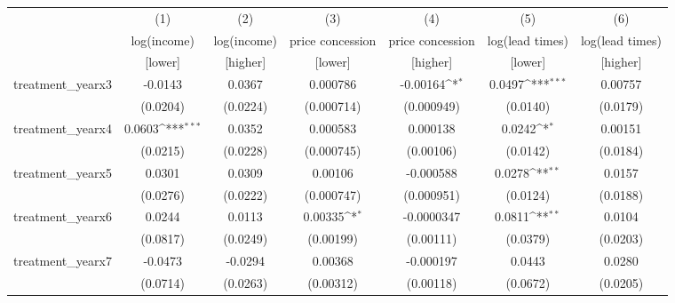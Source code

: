 {
\def\sym#1{\ifmmode^{#1}\else\(^{#1}\)\fi}
\begin{tabular}{l*{6}{c}}
\toprule
            &\multicolumn{1}{c}{(1)}&\multicolumn{1}{c}{(2)}&\multicolumn{1}{c}{(3)}&\multicolumn{1}{c}{(4)}&\multicolumn{1}{c}{(5)}&\multicolumn{1}{c}{(6)}\\
            &\multicolumn{1}{c}{log(income)}&\multicolumn{1}{c}{log(income)}&\multicolumn{1}{c}{price concession}&\multicolumn{1}{c}{price concession}&\multicolumn{1}{c}{log(lead times)}&\multicolumn{1}{c}{log(lead times)}\\
            &\multicolumn{1}{c}{[lower]}&\multicolumn{1}{c}{[higher]}&\multicolumn{1}{c}{[lower]}&\multicolumn{1}{c}{[higher]}&\multicolumn{1}{c}{[lower]}&\multicolumn{1}{c}{[higher]}\\
\midrule
treatment\_yearx3&     -0.0143         &      0.0367         &    0.000786         &    -0.00164\sym{*}  &      0.0497\sym{***}&     0.00757         \\
            &    (0.0204)         &    (0.0224)         &  (0.000714)         &  (0.000949)         &    (0.0140)         &    (0.0179)         \\
\addlinespace
treatment\_yearx4&      0.0603\sym{***}&      0.0352         &    0.000583         &    0.000138         &      0.0242\sym{*}  &     0.00151         \\
            &    (0.0215)         &    (0.0228)         &  (0.000745)         &   (0.00106)         &    (0.0142)         &    (0.0184)         \\
\addlinespace
treatment\_yearx5&      0.0301         &      0.0309         &     0.00106         &   -0.000588         &      0.0278\sym{**} &      0.0157         \\
            &    (0.0276)         &    (0.0222)         &  (0.000747)         &  (0.000951)         &    (0.0124)         &    (0.0188)         \\
\addlinespace
treatment\_yearx6&      0.0244         &      0.0113         &     0.00335\sym{*}  &  -0.0000347         &      0.0811\sym{**} &      0.0104         \\
            &    (0.0817)         &    (0.0249)         &   (0.00199)         &   (0.00111)         &    (0.0379)         &    (0.0203)         \\
\addlinespace
treatment\_yearx7&     -0.0473         &     -0.0294         &     0.00368         &   -0.000197         &      0.0443         &      0.0280         \\
            &    (0.0714)         &    (0.0263)         &   (0.00312)         &   (0.00118)         &    (0.0672)         &    (0.0205)         \\

\end{tabular}}
